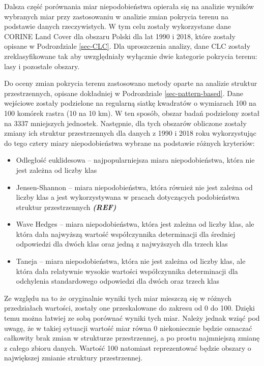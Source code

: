 \documentclass{amuthesis}
\begin{document}
Dalsza część porównania miar niepodobieństwa opierała się na analizie
wyników wybranych miar przy zastosowaniu w analizie zmian pokrycia
terenu na podstawie danych rzeczywistych. W tym celu zostały
wykorzystane dane CORINE Land Cover dla obszaru Polski dla lat 1990 i
2018, które zostały opisane w Podrozdziale \ref{sec-CLC}. Dla
uproszczenia analizy, dane CLC zostały zreklasyfikowane tak aby
uwzględniały wyłącznie dwie kategorie pokrycia terenu: lasy i pozostałe
obszary.

Do oceny zmian pokrycia terenu zastosowano metody oparte na analizie
struktur przestrzennych, opisane dokładniej w Podrozdziale
\ref{sec-pattern-based}. Dane wejściowe zostały podzielone na regularną
siatkę kwadratów o wymiarach 100 na 100 komórek rastra (10 na 10 km). W
ten sposób, obszar badań podzielony został na 3337 mniejszych jednostek.
Następnie, dla tych obszarów obliczone zostały zmiany ich struktur
przestrzennych dla danych z 1990 i 2018 roku wykorzystując do tego
cztery miary niepodobieństwa wybrane na podstawie różnych kryteriów:

\begin{itemize}
\tightlist
\item
  Odległość euklidesowa -- najpopularniejsza miara niepodobieństwa,
  która nie jest zależna od liczby klas
\item
  Jensen-Shannon -- miara niepodobieństwa, która również nie jest
  zależna od liczby klas a jest wykorzystywana w pracach dotyczących
  podobieństwa struktur przestrzennych \textbf{\emph{(REF)}}
\item
  Wave Hedges -- miara niepodobieństwa, która jest zależna od liczby
  klas, ale która dała najwyższą wartość współczynnika determinacji dla
  średniej odpowiedzi dla dwóch klas oraz jedną z najwyższych dla trzech
  klas
\item
  Taneja -- miara niepodobieństwa, która nie jest zależna od liczby
  klas, ale która dała relatywnie wysokie wartości współczynnika
  determinacji dla odchylenia standardowego odpowiedzi dla dwóch oraz
  trzech klas
\end{itemize}

Ze względu na to że oryginalnie wyniki tych miar mieszczą się w różnych
przedziałach wartości, zostały one przeskalowane do zakresu od 0 do 100.
Dzięki temu można łatwiej ze sobą porównać wyniki tych miar. Należy
jednak wziąć pod uwagę, że w takiej sytuacji wartość miar równa 0
niekoniecznie będzie oznaczać całkowity brak zmian w strukturze
przestrzennej, a po prostu najmniejszą zmianę z całego zbioru danych.
Wartość 100 natomiast reprezentować będzie obszary o największej zmianie
struktury przestrzennej.
\end{document}
